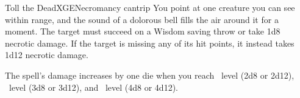 \begin{spell}{Toll the Dead}{XGE}{Necromancy cantrip}
{
}
You point at one creature you can see within range, and the
sound of a dolorous bell fills the air around it for a
moment. The target must succeed on a Wisdom saving throw or
take 1d8 necrotic damage. If the target is missing any of
its hit points, it instead takes 1d12 necrotic damage.

 The spell's damage increases by one
die when you reach ~level (2d8 or 2d12),
~level (3d8 or 3d12), and ~level (4d8 or 4d12).
\end{spell}
